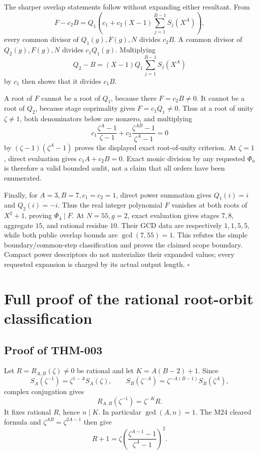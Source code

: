 \documentclass[11pt]{article}
\begin{document}
The sharper overlap statements follow without expanding either resultant.
From
\[
F-c_2B
=Q_1\left(c_1+c_2(X-1)\sum_{j=1}^{B-1}S_j(X^A)\right),
\]
every common divisor of \(Q_1(g),F(g),N\) divides \(c_2B\). A common divisor
of \(Q_2(g),F(g),N\) divides \(c_1Q_1(g)\). Multiplying
\[
Q_2-B=(X-1)Q_1\sum_{j=1}^{B-1}S_j(X^A)
\]
by \(c_1\) then shows that it divides \(c_1B\).

A root of \(F\) cannot be a root of \(Q_1\), because there \(F=c_2B\ne0\).
It cannot be a root of \(Q_2\), because stage coprimality gives
\(F=c_1Q_1\ne0\). Thus at a root of unity \(\zeta\ne1\), both denominators
below are nonzero, and multiplying
\[
c_1\frac{\zeta^A-1}{\zeta-1}
+c_2\frac{\zeta^{AB}-1}{\zeta^A-1}=0
\]
by \((\zeta-1)(\zeta^A-1)\) proves the displayed exact root-of-unity
criterion. At \(\zeta=1\), direct evaluation gives
\(c_1A+c_2B=0\). Exact monic division by any requested \(\Phi_n\) is
therefore a valid bounded audit, not a claim that all orders have been
enumerated.

Finally, for \(A=3,B=7,c_1=c_2=1\), direct power summation gives
\(Q_1(i)=i\) and \(Q_2(i)=-i\). Thus the real integer polynomial \(F\)
vanishes at both roots of \(X^2+1\), proving \(\Phi_4\mid F\). At
\(N=55,g=2\), exact evaluation gives stages \(7,8\), aggregate \(15\), and
rational residue \(10\). Their GCD data are respectively \(1,1,5,5\), while
both public overlap bounds are \(\gcd(7,55)=1\). This refutes the simple
boundary/common-step classification and proves the claimed scope
boundary. Compact power descriptors do not materialize their expanded
values; every requested expansion is charged by its actual output length.
\(\square\)

\section{Full proof of the rational root-orbit classification}

\subsection{Proof of THM-003}\label{proof:THM-003}

Let \(R=R_{A,B}(\zeta)\ne0\) be rational and let
\(K=A(B-2)+1\). Since
\[
S_A(\zeta^{-1})=\zeta^{1-A}S_A(\zeta),\qquad
S_B(\zeta^{-A})=\zeta^{-A(B-1)}S_B(\zeta^A),
\]
complex conjugation gives
\[
R_{A,B}(\zeta^{-1})=\zeta^{-K}R.
\]
It fixes rational \(R\), hence \(n\mid K\). In particular
\(\gcd(A,n)=1\). The M24 cleared formula and
\(\zeta^{AB}=\zeta^{2A-1}\) then give
\[
R+1=\zeta\left(\frac{\zeta^{A-1}-1}{\zeta^A-1}\right)^2. \tag{20}
\]
\end{document}
